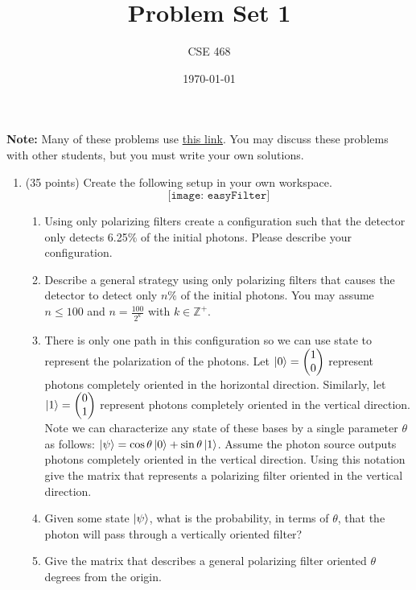 \documentclass[12pt]{article}
\title{Problem Set 1}
\author{CSE 468}
\date{\today}
\begin{document}
\maketitle

\noindent \textbf{Note:} Many of these problems use \href{https://lab.quantumflytrap.com/lab}{this link}.
You may discuss these problems with other students, but you must write your own solutions.

\begin{enumerate}[font=\bfseries]
    \item (35 points) Create the following setup in your own workspace.\\
    \[\texttt{[image: easyFilter]}\]
    \begin{enumerate}
        \item Using only polarizing filters create a configuration such that the detector only detects 6.25$\%$ of the initial photons. Please describe your configuration.
        \item Describe a general strategy using only polarizing filters that causes the detector to detect only $n\%$ of the initial photons. You may assume $n \leq 100$ and $n = \frac{100}{2^k}$ with $k\in\mathbb{Z}^+$.
        \item There is only one path in this configuration so we can use state to represent the polarization of the photons. Let $\ket{0} = \begin{pmatrix}1 \\ 0 \end{pmatrix}$ represent photons completely oriented in the horizontal direction. Similarly, let $\ket{1} = \begin{pmatrix}0 \\ 1 \end{pmatrix}$ represent photons completely oriented in the vertical direction. Note we can characterize any state of these bases by a single parameter $\theta$ as follows: $\ket{\psi} = \cos{\theta}\ket{0} + \sin{\theta}\ket{1}$. Assume the photon source outputs photons completely oriented in the vertical direction. Using this notation give the matrix that represents a polarizing filter oriented in the vertical direction.
        \item Given some state $\ket{\psi}$, what is the probability, in terms of $\theta$, that the photon will pass through a vertically oriented filter?
        \item Give the matrix that describes a general polarizing filter oriented $\theta$ degrees from the origin.

\end{enumerate}
\end{enumerate}
\end{document}
